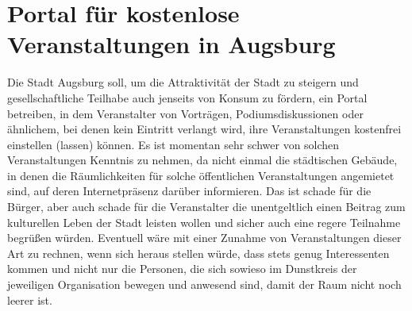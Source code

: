   \section{Portal für kostenlose Veranstaltungen in Augsburg}
  
  Die Stadt Augsburg soll, um die Attraktivität der Stadt zu steigern und 
  gesellschaftliche Teilhabe auch jenseits von Konsum zu fördern, ein Portal 
  betreiben, in dem Veranstalter von Vorträgen, Podiumsdiskussionen oder 
  ähnlichem, bei denen kein Eintritt verlangt wird, ihre Veranstaltungen 
  kostenfrei einstellen (lassen) können. Es ist momentan sehr schwer von 
  solchen Veranstaltungen Kenntnis zu nehmen, da nicht einmal die städtischen 
  Gebäude, in denen die Räumlichkeiten für solche öffentlichen 
  Veranstaltungen angemietet sind, auf deren Internetpräsenz darüber 
  informieren. Das ist schade für die Bürger, aber auch schade für die 
  Veranstalter die unentgeltlich einen Beitrag zum kulturellen Leben der 
  Stadt leisten wollen und sicher auch eine regere Teilnahme begrüßen würden. 
  Eventuell wäre mit einer Zunahme von Veranstaltungen dieser Art zu rechnen, 
  wenn sich heraus stellen würde, dass stets genug Interessenten kommen und 
  nicht nur die Personen, die sich sowieso im Dunstkreis der jeweiligen 
  Organisation bewegen und anwesend sind, damit der Raum nicht noch leerer 
  ist.